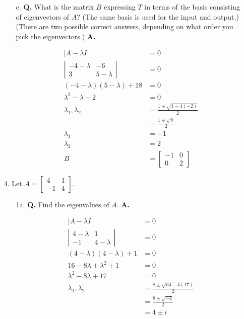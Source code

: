 \documentclass[main.tex]{subfiles}
\begin{document}
\begin{enumerate}
\begin{enumerate}
        \item [c.] \textbf{Q.} What is the matrix $B$ expressing $T$ in terms of the basis consisting of eigenvectors of $A$? (The same basis is used for the input and output.) (There are two possible correct answers, depending on what order you pick the eigenvectors.) 
        \textbf{A.}

        $$
        \begin{aligned}
        |A-\lambda I|&=0 \\
        \left|\begin{array}{cc}
        -4-\lambda & -6 \\
        3 & 5-\lambda
        \end{array}\right|&=0\\
        (-4-\lambda)(5-\lambda) + 18 &= 0\\
        \lambda^2 - \lambda - 2 & = 0\\
        \lambda_{1}, \lambda_{2} &= \frac{1 \pm \sqrt{1-4(-2)}}{2}\\
        &= \frac{1 \pm \sqrt{9}}{2}\\
        \lambda_1 & = -1\\
        \lambda_2 & = 2\\
        B &=\left[\begin{array}{cc}
        -1 & 0 \\
        0 & 2
        \end{array}\right]
        \end{aligned}
        $$
        
    \end{enumerate}

\item[4.] Let $A=\left[\begin{array}{rr}4 & 1 \\ -1 & 4\end{array}\right]$.
    \begin{enumerate}
    \item [1a.] \textbf{Q.} Find the eigenvalues of $A$. 
    \textbf{A.}

    $$
    \begin{aligned}
    |A-\lambda I| &= 0\\
    \left|\begin{array}{cc}
    4-\lambda & 1 \\
    -1 & 4-\lambda
    \end{array}\right| &= 0 \\
    (4-\lambda)(4-\lambda)+1 &= 0 \\
    16-8 \lambda+\lambda^{2}+1 &= 0 \\
    \lambda^{2}-8 \lambda+17 &= 0 \\
    \lambda_1,\lambda_2 &= \frac{8 \pm \sqrt{64-4(17)}}{2}\\
    & = \frac{8 \pm \sqrt{-4}}{2}\\
    & = 4\pm i
    \end{aligned}
    $$


\end{enumerate}
\end{enumerate}
\end{document}
